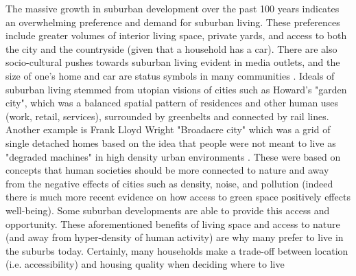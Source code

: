 The massive growth in suburban development over the past 100 years indicates an overwhelming preference and demand for suburban living. These preferences include greater volumes of interior living space, private yards, and access to both the city and the countryside (given that a household has a car). There are also socio-cultural pushes towards suburban living evident in media outlets, and the size of one's home and car are status symbols in many communities \cite{kunstler_geography_1994}. Ideals of suburban living stemmed from utopian visions of cities such as Howard's "garden city", which was a balanced spatial pattern of residences and other human uses (work, retail, services), surrounded by greenbelts and connected by rail lines. Another example is Frank Lloyd Wright "Broadacre city" which was a grid of single detached homes based on the idea that people were not meant to live as "degraded machines" in high density urban environments \cite{wegener_land-use_2004}. These were based on concepts that  human societies should be more connected to nature and away from the negative effects of cities such as density, noise, and pollution (indeed there is much more recent evidence on how access to green space positively effects well-being). Some suburban developments are able to provide this access and opportunity. These aforementioned benefits of living space and access to nature (and away from hyper-density of human activity) are why many prefer to live in the suburbs today. Certainly, many households make a trade-off between location (i.e. accessibility) and housing quality when deciding where to live \cite{lee_neighborhood_1994,alonso_location_1964}

